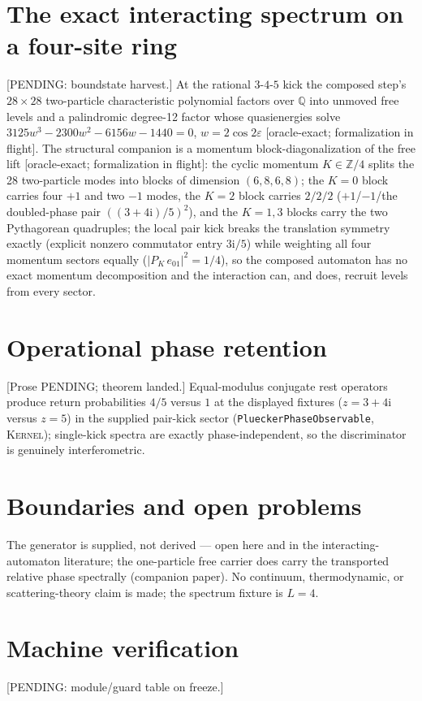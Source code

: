 \documentclass[11pt]{article}
\newcommand{\ii}{\mathrm{i}}
\newcommand{\Kernel}{\textcolor{kernelcolor}{\textsc{Kernel}}}
\begin{document}
\section{The exact interacting spectrum on a four-site ring}
[PENDING: boundstate harvest.]  At the rational $3$-$4$-$5$ kick the
composed step's $28\times28$ two-particle characteristic polynomial
factors over $\mathbb{Q}$ into unmoved free levels and a palindromic
degree-12 factor whose quasienergies solve
$3125w^3-2300w^2-6156w-1440=0$, $w=2\cos2\varepsilon$ [oracle-exact;
formalization in flight].  The structural companion is a momentum
block-diagonalization of the free lift [oracle-exact; formalization in
flight]: the cyclic momentum $K\in\mathbb{Z}/4$ splits the 28
two-particle modes into blocks of dimension $(6,8,6,8)$; the $K=0$ block
carries four $+1$ and two $-1$ modes, the $K=2$ block carries $2/2/2$
($+1$/$-1$/the doubled-phase pair $((3+4\ii)/5)^2$), and the $K=1,3$
blocks carry the two Pythagorean quadruples; the local pair kick breaks
the translation symmetry exactly (explicit nonzero commutator entry
$3\ii/5$) while weighting all four momentum sectors equally
($|P_K\,e_{01}|^2=1/4$), so the composed automaton has no exact momentum
decomposition and the interaction can, and does, recruit levels from
every sector.

\section{Operational phase retention}
[Prose PENDING; theorem landed.]  Equal-modulus conjugate rest operators
produce return probabilities $4/5$ versus $1$ at the displayed fixtures
($z=3+4\ii$ versus $z=5$) in the supplied pair-kick
sector (\texttt{PlueckerPhaseObservable}, \Kernel{}); single-kick
spectra are exactly phase-independent, so the discriminator is genuinely
interferometric.

\section{Boundaries and open problems}
The generator is supplied, not derived --- open here and in the
interacting-automaton literature; the one-particle free carrier does
carry the transported relative phase spectrally (companion paper).
No continuum, thermodynamic, or scattering-theory claim is made; the
spectrum fixture is $L=4$.

\appendix
\section{Machine verification}
[PENDING: module/guard table on freeze.]
\end{document}
